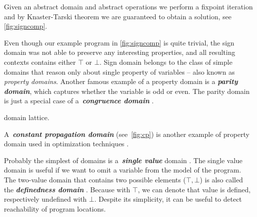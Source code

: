 \prule
\bigskip

\noindent
Given an abstract domain and abstract operations we perform a fixpoint iteration and by Knaster-Tarski theorem
\cite{Tarski1955} we are guaranteed to obtain a solution, see
\autoref{fig:signcomp}.

Even though our example program in \autoref{fig:signcomp} is quite trivial, the
sign domain  was not able to preserve any interesting properties,
and all resulting contexts contains either $\top$ or $\bot$.  Sign domain belongs to
the class of simple domains that reason only about single property of variables --
also known as \emph{property domains}. Another famous example of a property
domain is a \textbf{\emph{parity domain}}, which captures whether the
variable is odd or even. The parity domain is just a special case of
a~\textbf{\emph{congruence domain}} \cite{Granger1989, Granger1991}.
\begin{marginfigure}%
    \centering
{}
    \caption{ domain lattice.}
    \label{fig:cp}%
\end{marginfigure}%
A~\textbf{\emph{constant propagation domain}} 
(see~\autoref{fig:cp}) is another example of property domain used in
optimization techniques \cite{Kildall1973}.

Probably the simplest of domains is a~\textbf{\emph{single value}} domain
. The single value domain is useful if we want to omit a variable
from the model of the program. The two-value domain that contains two possible
elements ($\top, \bot$) is also called the \textbf{\emph{definedness domain}}
. Because with $\top$, we can denote that value is defined,
respectively undefined with $\bot$. Despite its simplicity, it can be useful to
detect reachability of program locations.

